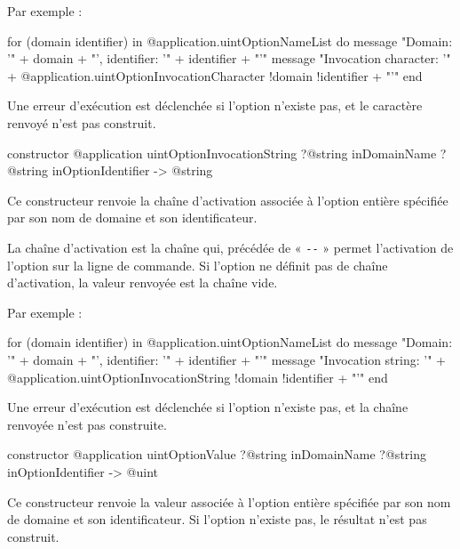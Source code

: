  Par exemple :
\begin{galgas}
for (domain identifier) in @application.uintOptionNameList do
  message "Domain: '" + domain + "', identifier: '" + identifier + "'\n"
  message "Invocation character: '"
    + @application.uintOptionInvocationCharacter {!domain !identifier} + "'\n"
end
\end{galgas}

Une erreur d'exécution est déclenchée si l'option n'existe pas, et le caractère renvoyé n'est pas construit.



\begin{galgasbox}
constructor @application uintOptionInvocationString
    ?@string inDomainName
    ?@string inOptionIdentifier -> @string
\end{galgasbox}

Ce constructeur renvoie la chaîne d'activation associée à l'option entière spécifiée par son nom de domaine et son identificateur.

La chaîne d'activation est la chaîne qui, précédée de « \texttt{-{}-} » permet l'activation de l'option sur la ligne de commande. Si l'option ne définit pas de chaîne d'activation, la valeur renvoyée est la chaîne vide.

 Par exemple :
\begin{galgas}
for (domain identifier) in @application.uintOptionNameList do
  message "Domain: '" + domain + "', identifier: '" + identifier + "'\n"
  message "Invocation string: '"
    + @application.uintOptionInvocationString {!domain !identifier} + "'\n"
end
\end{galgas}

Une erreur d'exécution est déclenchée si l'option n'existe pas, et la chaîne renvoyée n'est pas construite.



\begin{galgasbox}
constructor @application uintOptionValue
    ?@string inDomainName
    ?@string inOptionIdentifier -> @uint
\end{galgasbox}

Ce constructeur renvoie la valeur associée à l'option entière spécifiée par son nom de domaine et son identificateur. Si l'option n'existe pas, le résultat n'est pas construit.






